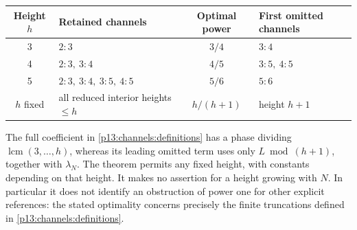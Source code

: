 \begin{center}
\begin{tabular}{@{}clcl@{}}
\toprule
Height $h$ & Retained channels & Optimal power & First omitted channels\\
\midrule
3 & $2:3$ & $3/4$ & $3:4$\\
4 & $2:3,\ 3:4$ & $4/5$ & $3:5,\ 4:5$\\
5 & $2:3,\ 3:4,\ 3:5,\ 4:5$ & $5/6$ & $5:6$\\
$h$ fixed & all reduced interior heights $\leq h$
   & $h/(h+1)$ & height $h+1$\\
\bottomrule
\end{tabular}
\end{center}

The full coefficient in \eqref{p13:channels:definitions} has a phase
dividing $\operatorname{lcm}(3,\ldots,h)$, whereas its leading omitted
term uses only $L\bmod(h+1)$, together with $\lambda_N$.
The theorem permits any fixed height, with constants depending on that
height.  It makes no assertion for a height growing with $N$.
In particular it does not identify an obstruction of power one for
other explicit references: the stated optimality concerns precisely the
finite truncations defined in \eqref{p13:channels:definitions}.
